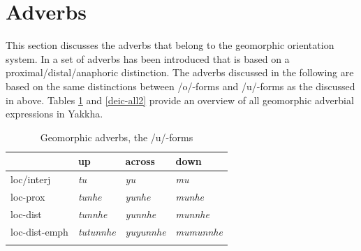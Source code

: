 \section{Adverbs}\label{geodeixis}

This section discusses the adverbs that belong to the geomorphic  orientation system. In  a set of adverbs has been introduced that is based on a proximal/distal/anaphoric distinction. The adverbs discussed in the following are based on the same distinctions between /o/-forms and /u/-forms as the  discussed in  above. 
Tables \ref{deic-all1} and \ref{deic-all2}  provide an overview of all geomorphic adverbial expressions in Yakkha. 
	 	  
 \begin{table}[htp]
\begin{centering}
\begin{tabular}{llll}
\lsptoprule
									&{\sc up}		&{\sc across}&{\sc down}\\
\midrule
			{\sc loc/interj}	&\emph{tu}&\emph{yu}&\emph{mu}\\
			{\sc loc-prox}&\emph{tunhe}&\emph{yunhe}&\emph{munhe}\\
			{\sc loc-dist}&\emph{tunnhe}&\emph{yunnhe}&\emph{munnhe}\\
			{\sc loc-dist-emph}&\emph{tutunnhe}&\emph{yuyunnhe}&\emph{mumunnhe}\\
\lspbottomrule
\end{tabular} 
\caption{Geomorphic adverbs, the /u/-forms}\label{deic-all1}
\end{centering}
\end{table}

